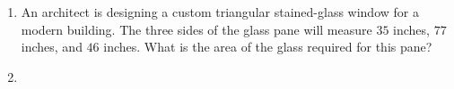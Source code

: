 \documentclass[11pt]{article}
\begin{document}
\begin{enumerate}
{{\(c_2 = \frac{8.5\sin(13.3^\circ)}{\sin(27^\circ)} \approx 4.29\)

\(\boxed{\begin{aligned} A &= 27^\circ & a &= 8.5 \\ B_1 &\approx 40.3^\circ & b &= 12.1 \\ C_1 &\approx 112.7^\circ & c_1 &\approx 17.27 \end{aligned}}\)

\(\boxed{\begin{aligned} A &= 27^\circ & a &= 8.5 \\ B_2 &\approx 139.7^\circ & b &= 12.1 \\ C_2 &\approx 13.3^\circ & c_2 &\approx 4.29 \end{aligned}}\)

}
}

\newpage

% 

\item %
\providecommand{\stxKnowl}{}\renewcommand{\stxKnowl}[1]{#1}
\providecommand{\stxOuttro}{}\renewcommand{\stxOuttro}[1]{#1}
\providecommand{\stxTitle}{}\renewcommand{\stxTitle}[1]{#1}
\renewcommand{\stxOuttro}[1]{}
\stxKnowl{
An architect is designing a custom triangular stained-glass window for a modern building. The three sides of the glass pane will measure \(35\) inches, \(77\) inches, and \(46\) inches. What is the area of the glass required for this pane?

\stxOuttro{
\(s = \frac{a + b + c}{2}\)

\(s = \frac{35 + 77 + 46}{2} = 79.0000000000000\)

\(\text{Area} = \sqrt{s(s-a)(s-b)(s-c)}\)

\(\text{Area} = \sqrt{79.0000000000000(79.0000000000000-35)(79.0000000000000-77)(79.0000000000000-46)}\)

\(\text{Area} = \sqrt{79.0000000000000(44.0000000000000)(2.00000000000000)(33.0000000000000)}\)

\(\boxed{\text{Area} \approx 478.97}\)

}
}

\newpage

% 

\item %
\providecommand{\stxKnowl}{}\renewcommand{\stxKnowl}[1]{#1}
\providecommand{\stxOuttro}{}\renewcommand{\stxOuttro}[1]{#1}
\providecommand{\stxTitle}{}\renewcommand{\stxTitle}[1]{#1}
\renewcommand{\stxOuttro}[1]{}
\stxKnowl{

}
\end{enumerate}
\end{document}

